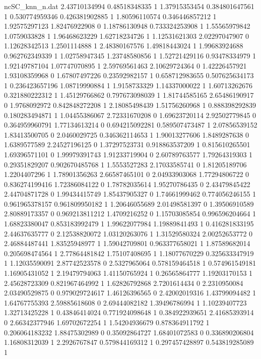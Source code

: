 \begin{filecontents}{ncSC_knn_n.dat}
2.43710134994 0.48518348335 1
1.37915353454 0.384801647561 1
0.530774959346 0.426381902885 1
1.80596110574 0.346446857212 1
1.92575297123 1.82476922908 0
1.18786130948 0.733324253908 1
1.55565979842 1.0759033828 1
1.96468623229 1.62718234726 1
1.12531621303 2.02297047907 0
1.12628342513 1.2501114888 1
2.48380167576 1.49818443024 1
1.99683924688 0.962762349339 1
1.02758947345 1.23748580856 1
1.52721429116 0.93478334979 1
1.92149787104 1.07747070895 1
2.59769561463 2.10629724364 0
1.42226457921 1.93108359968 0
1.67807497226 0.23592982157 1
0.658712983655 0.507625634173 1
0.236423657196 1.08719990884 1
1.9158733329 1.14337000022 1
1.60713262676 0.321880222312 1
1.45129766862 0.797673098039 1
1.81744585165 2.65486190917 0
1.9768092972 0.842848272208 1
2.18085498439 1.51756260968 1
0.888398292839 0.180283494871 1
1.04455386067 2.72331670208 0
1.69623720114 2.92502779845 0
0.364959960791 1.77134613214 0
0.694215092281 0.589507473487 1
2.07856539152 1.83413500705 0
2.0460029725 0.346362114653 1
1.90013277606 1.8489287638 0
1.6389577589 2.24527196125 0
1.37297523731 0.918863537209 1
0.815610265501 1.69396571101 0
1.99979391743 1.91233719904 0
2.60789763577 1.79264319303 1
0.29351829207 0.902670485768 1
1.5553527283 2.17033585741 0
1.81205189706 1.2204407296 1
1.78901356263 2.66587465101 0
2.04933903068 1.77294806722 0
0.836274199416 1.72386084122 0
1.78782035614 1.95270786435 0
2.43479845422 2.44704871728 0
1.99434415749 1.85437905327 0
1.74661999462 0.774056246155 1
0.961965378157 0.961809950182 1
1.20646055689 2.01498581397 0
1.39506910589 2.80889173357 0
0.969213811212 1.4709216252 0
1.15703085854 0.996596204664 1
1.68823380047 0.853183992479 1
1.99622077984 1.19889841493 1
0.416281833195 2.44637635777 0
2.12538820072 1.03120263076 1
1.31529580324 2.00252653772 0
2.46884487441 1.83525948977 1
1.59042709801 0.963377658021 1
1.87589682014 0.205698474564 1
2.77864481842 1.75107408695 1
1.18077670229 0.325633347919 1
1.12035590091 2.87742523578 0
2.5327965064 0.578159464518 1
0.574961549181 1.16905431052 1
2.19479794063 1.41150765924 1
0.26565864777 1.19203170153 1
2.45628723309 0.821967464992 1
1.62826792868 2.7201614434 0
2.2310950084 2.03490529875 0
0.979029724617 1.46126396565 0
2.42002019316 1.43799094482 1
1.64767755393 2.59885618608 0
2.69444082182 1.39496786994 1
1.10239407723 1.32713425228 1
0.43846414024 0.771924098648 1
0.384922939651 2.41685393914 0
2.66342377946 1.69702672254 1
1.54204936679 0.878364911792 1
0.206064183232 1.88475302989 0
0.35092864727 1.68401072583 0
0.336890206804 1.16808312039 1
2.2926767847 0.579844169312 1
0.297457428897 0.543819285089 1

\end{filecontents}
